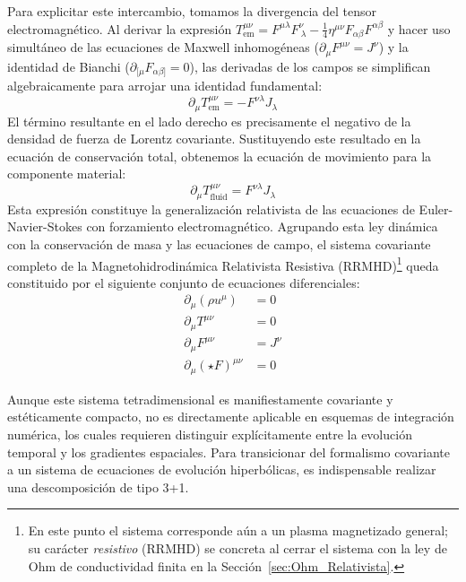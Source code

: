 Para explicitar este intercambio, tomamos la divergencia del tensor electromagnético. Al derivar la expresión $T^{\mu\nu}_{\text{em}} = F^{\mu\lambda} F^\nu_{\ \lambda} - \frac{1}{4} \eta^{\mu\nu} F_{\alpha\beta} F^{\alpha\beta}$ y hacer uso simultáneo de las ecuaciones de Maxwell inhomogéneas ($\partial_\mu F^{\mu\nu} = J^\nu$) y la identidad de Bianchi ($\partial_{[\mu} F_{\alpha\beta]} = 0$), las derivadas de los campos se simplifican algebraicamente para arrojar una identidad fundamental:
\begin{equation}
    \partial_\mu T^{\mu\nu}_{\text{em}} = - F^{\nu\lambda} J_\lambda
\end{equation}
El término resultante en el lado derecho es precisamente el negativo de la densidad de fuerza de Lorentz covariante. Sustituyendo este resultado en la ecuación de conservación total, obtenemos la ecuación de movimiento para la componente material:
\begin{equation}
    \partial_\mu T^{\mu\nu}_{\text{fluid}} = F^{\nu\lambda} J_\lambda
\end{equation}
Esta expresión constituye la generalización relativista de las ecuaciones de Euler-Navier-Stokes con forzamiento electromagnético. Agrupando esta ley dinámica con la conservación de masa y las ecuaciones de campo, el sistema covariante completo de la Magnetohidrodinámica Relativista Resistiva (RRMHD)\footnote{En este punto el sistema corresponde aún a un plasma magnetizado general; su carácter \emph{resistivo} (RRMHD) se concreta al cerrar el sistema con la ley de Ohm de conductividad finita en la Sección~\ref{sec:Ohm_Relativista}.} queda constituido por el siguiente conjunto de ecuaciones diferenciales:
\begin{align}
    \partial_\mu (\rho u^\mu) &= 0 \\
    \partial_\mu T^{\mu\nu} &= 0 \\
    \partial_\mu F^{\mu\nu} &= J^\nu \\
    \partial_\mu (\star F)^{\mu\nu} &= 0
\end{align}

Aunque este sistema tetradimensional es manifiestamente covariante y estéticamente compacto, no es directamente aplicable en esquemas de integración numérica, los cuales requieren distinguir explícitamente entre la evolución temporal y los gradientes espaciales. Para transicionar del formalismo covariante a un sistema de ecuaciones de evolución hiperbólicas, es indispensable realizar una descomposición de tipo 3+1. 

